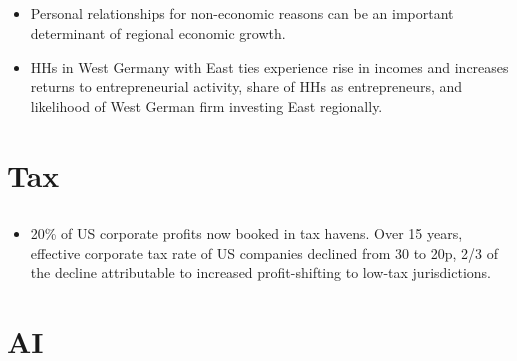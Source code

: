 \documentclass[10pt]{article} %
\begin{document}
    \subsection{\cite{BurchardiHassan2013}}
    \begin{itemize}
        \item Personal relationships for non-economic reasons can be an important determinant of regional economic growth.
        \item HHs in West Germany with East ties experience rise in incomes and increases returns to entrepreneurial activity, share of HHs as entrepreneurs, and likelihood of West German firm investing East regionally.
    \end{itemize}

\section{Tax}

    \subsection{\cite{Zucman2014}}
    \begin{itemize}
        \item 20\% of US corporate profits now booked in tax havens. Over 15 years, effective corporate tax rate of US companies declined from 30 to 20p, 2/3 of the decline attributable to increased profit-shifting to low-tax jurisdictions.
    \end{itemize}
    
\section{AI}
\end{document}
